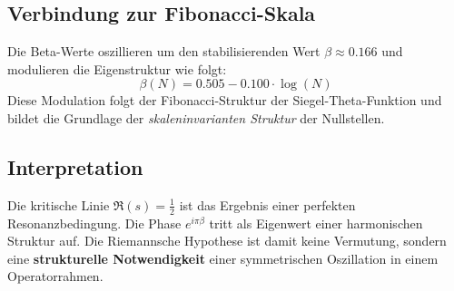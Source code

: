 \subsection{Verbindung zur Fibonacci-Skala}

Die Beta-Werte oszillieren um den stabilisierenden Wert \(\beta \approx 0.166\) und modulieren die Eigenstruktur wie folgt:
\[
\beta(N) = 0.505 - 0.100 \cdot \log(N)
\]
Diese Modulation folgt der Fibonacci-Struktur der Siegel-Theta-Funktion und bildet die Grundlage der \emph{skaleninvarianten Struktur} der Nullstellen.

\subsection{Interpretation}

Die kritische Linie \(\Re(s) = \frac{1}{2}\) ist das Ergebnis einer perfekten Resonanzbedingung. Die Phase \(e^{i\pi \beta}\) tritt als Eigenwert einer harmonischen Struktur auf. Die Riemannsche Hypothese ist damit keine Vermutung, sondern eine \textbf{strukturelle Notwendigkeit} einer symmetrischen Oszillation in einem Operatorrahmen.